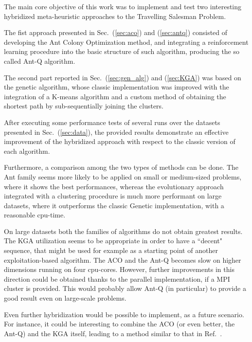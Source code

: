 \documentclass[10pt]{article}
\begin{document}
The main core objective of this work was to implement and test two interesting hybridized meta-heuristic approaches to the Travelling Salesman Problem.

The fist approach presented in Sec.~(\ref{sec:aco}) and (\ref{sec:antq}) consisted of developing the Ant Colony Optimization method, and integrating a reinforcement learning procedure into the basic structure of such algorithm, producing the so called Ant-Q algorithm.

The second part reported in Sec.~(\ref{sec:gen_alg}) and (\ref{sec:KGA}) was based on the genetic algorithm, whose classic implementation was improved with the integration of a K-means algorithm and a custom method of obtaining the shortest path by sub-sequentially joining the clusters.

After executing some performance tests of several runs over the datasets presented in Sec.~(\ref{sec:data}), the provided results demonstrate an effective improvement of the hybridized approach with respect to the classic version of each algorithm.

Furthermore, a comparison among the two types of methods can be done. The Ant family seems more likely to be applied on small or medium-sized problems, where it shows the best performances, whereas the evolutionary approach integrated with a clustering procedure is much more performant on large datasets, where it outperforms the classic Genetic implementation, with a reasonable cpu-time. 

On large datasets both the families of algorithms do not obtain greatest results. The KGA utilization seems to be appropriate in order to have a ``decent" sequence, that might be used for example as a starting point of another exploitation-based algorithm. The ACO and the Ant-Q becomes slow on higher dimensions running on four cpu-cores. However, further improvements in this direction could be obtained thanks to the parallel implementation, if a MPI cluster is provided. This would probably allow Ant-Q (in particular) to provide a good result even on large-scale problems.

Even further hybridization would be possible to implement, as a future scenario. For instance, it could be interesting to combine the ACO (or even better, the Ant-Q) and the KGA itself, leading to a method similar to that in Ref.~\cite{mixed}.
\end{document}

